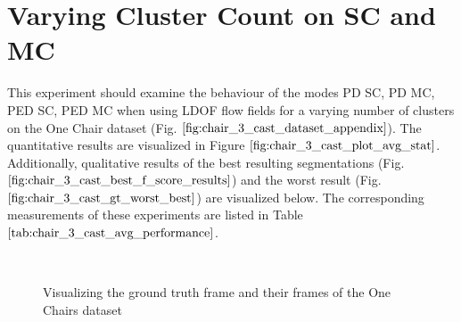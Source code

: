 \section{Varying Cluster Count on SC and MC}
This experiment should examine the behaviour of the modes PD SC, PD MC, PED SC, PED MC when using LDOF flow fields for a varying number of clusters on the One Chair dataset (Fig. $\ref{fig:chair_3_cast_dataset_appendix}$). The quantitative results are visualized in Figure $\ref{fig:chair_3_cast_plot_avg_stat}$. Additionally, qualitative results of the best resulting segmentations (Fig. $\ref{fig:chair_3_cast_best_f_score_results}$) and the worst result (Fig. $\ref{fig:chair_3_cast_gt_worst_best}$) are visualized below. The corresponding measurements of these experiments are listed in Table $\ref{tab:chair_3_cast_avg_performance}$.
\begin{figure}[H]
\begin{center}
~
\end{center}
\caption[Chair 3 Cast Dataset]{Visualizing the ground truth frame and their frames of the One Chairs dataset}
\label{fig:chair_3_cast_dataset_appendix}
\end{figure}


